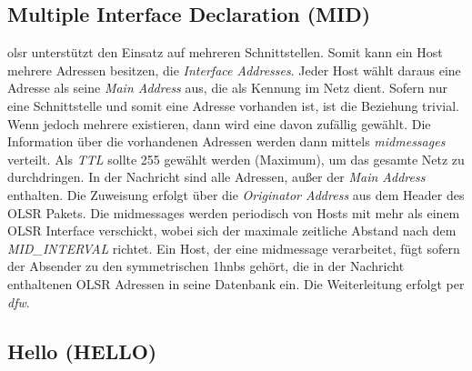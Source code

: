 
\subsection{Multiple Interface Declaration (MID)}
\label{chapter:routing:olsr:mid}

\gls{olsr} unterstützt den Einsatz auf mehreren Schnittstellen. Somit kann ein Host mehrere Adressen besitzen, die \textit{Interface Addresses}. Jeder Host wählt daraus eine Adresse als seine \textit{Main Address} aus, die als Kennung im Netz dient. Sofern nur eine Schnittstelle und somit eine Adresse vorhanden ist, ist die Beziehung trivial. Wenn jedoch mehrere existieren, dann wird eine davon zufällig gewählt. Die Information über die vorhandenen Adressen werden dann mittels \textit{\glspl{midmessage}} verteilt. Als \textit{TTL} sollte 255 gewählt werden (Maximum), um das gesamte Netz zu durchdringen. In der Nachricht sind alle Adressen, außer der \textit{Main Address} enthalten. Die Zuweisung erfolgt über die \textit{Originator Address} aus dem Header des OLSR Pakets. Die \glspl{midmessage} werden periodisch von Hosts mit mehr als einem OLSR Interface verschickt, wobei sich der maximale zeitliche Abstand nach dem \textit{MID\_INTERVAL} richtet. Ein Host, der eine \gls{midmessage} verarbeitet, fügt sofern der Absender zu den symmetrischen \glspl{1hnb} gehört, die in der Nachricht enthaltenen OLSR Adressen in seine Datenbank ein. Die Weiterleitung erfolgt per \textit{\gls{dfw}}.


\subsection{Hello (HELLO)}
\label{chapter:routing:olsr:hello}


